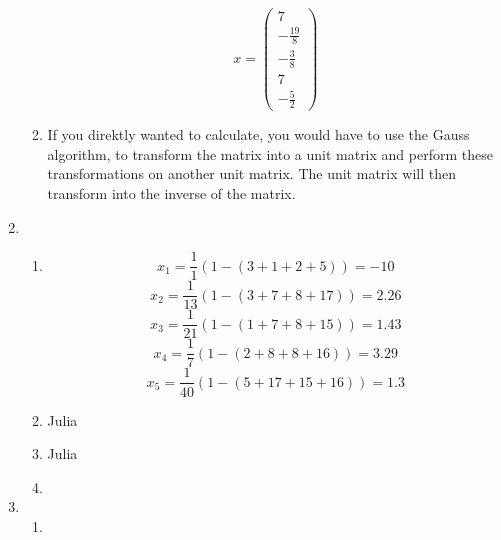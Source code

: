 \documentclass[]{book}
\theoremstyle{definition}
\begin{document}
\begin{enumerate}
\begin{enumerate}
        $$x = \begin{pmatrix} 7 \\ -\frac{19}{8} \\ -\frac{3}{8} \\ 7 \\ -\frac{5}{2} \end{pmatrix}$$
        \item If you direktly wanted to calculate, you would have to use the Gauss algorithm, to transform the matrix into a unit matrix and perform these transformations on another unit matrix. The unit matrix will then transform into the inverse of the matrix.
    \end{enumerate}
    \item \begin{enumerate}
        \item $$x_1 = \frac{1}{1}(1 - (3 + 1 + 2 + 5)) = -10$$
        $$x_2 = \frac{1}{13}(1 - (3 + 7 + 8 + 17)) = 2.26$$
        $$x_3 = \frac{1}{21}(1 - (1 + 7 + 8 + 15)) = 1.43$$
        $$x_4 = \frac{1}{7}(1 - (2 + 8 + 8 + 16)) = 3.29$$
        $$x_5 = \frac{1}{40}(1 - (5 + 17 + 15 + 16)) = 1.3$$
        \item Julia
        \item Julia
        \item 
    \end{enumerate}
    \item \begin{enumerate}
        \item 
    \end{enumerate}
\end{enumerate}
\end{document}
